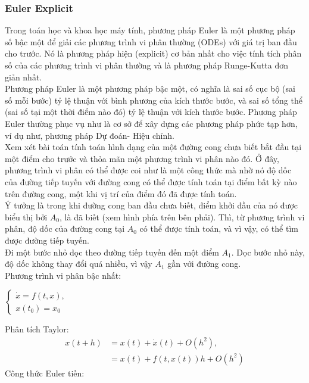 \documentclass[13pt,a4paper]{article}
\begin{document}
			\subsubsection{ Euler Explicit}
				Trong toán học và khoa học máy tính, phương pháp Euler là một phương pháp số bậc một để giải các phương trình vi phân thường (ODEs) với giá trị ban đầu cho trước. Nó là phương pháp hiện (explicit) cơ bản nhất cho việc tính tích phân số của các phương trình vi phân thường và là phương pháp Runge-Kutta đơn giản nhất.\\
				Phương pháp Euler là một phương pháp bậc một, có nghĩa là sai số cục bộ (sai số mỗi bước) tỷ lệ thuận với bình phương của kích thước bước, và sai số tổng thể (sai số tại một thời điểm nào đó) tỷ lệ thuận với kích thước bước. Phương pháp Euler thường phục vụ như là cơ sở để xây dựng các phương pháp phức tạp hơn, ví dụ như, phương pháp Dự đoán- Hiệu chỉnh. \\
				Xem xét bài toán tính toán hình dạng của một đường cong chưa biết bắt đầu tại một điểm cho trước và thỏa mãn một phương trình vi phân nào đó. Ở đây, phương trình vi phân có thể được coi như là một công thức mà nhờ nó độ dốc của đường tiếp tuyến với đường cong có thể được tính toán tại điểm bất kỳ nào trên đường cong, một khi vị trí của điểm đó đã được tính toán. \\
				Ý tưởng là trong khi đường cong ban đầu chưa biết, điểm khởi đầu của nó được biểu thị bởi $\displaystyle A_{0}$, là đã biết (xem hình phía trên bên phải). Thì, từ phương trình vi phân, độ dốc của đường cong tại $\displaystyle A_{0}$ có thể được tính toán, và vì vậy, có thể tìm được đường tiếp tuyến.\\
				Đi một bước nhỏ dọc theo đường tiếp tuyến đến một điểm $\displaystyle A_{1}$. Dọc bước nhỏ này, độ dốc không thay đổi quá nhiều, vì vậy $\displaystyle A_{1}$ gần với đường cong.\\
				Phương trình vi phân bậc nhất:
				\begin{center}
					$\left\{\begin{array}{l}
						\dot{x} = f(t,x), \\
						x(t_0) = x_0
					\end{array}\right.$ 
				\end{center}
				Phân tích Taylor:
				\begin{align*}
						x(t+h) &= x(t) + \dot{x}(t) + O(h^2), \\
						&= x(t) + f(t,x(t))h + O(h^2)
				\end{align*}
				Công thức Euler tiến:
\end{document}
